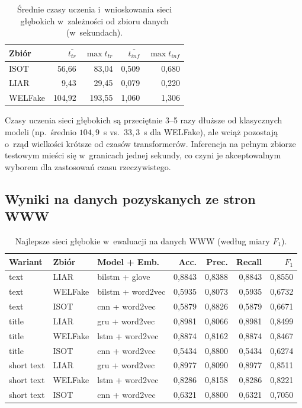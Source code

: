 \begin{table}[ht]
\centering
\caption{Średnie czasy uczenia i~wnioskowania sieci głębokich
w~zależności od zbioru danych (w~sekundach).}
\label{tab:dl_czasy}
\begin{tabular}{lrrrr}
\toprule
Zbiór & $\overline{t_{tr}}$ & $\max{t_{tr}}$ & $\overline{t_{inf}}$ & $\max{t_{inf}}$ \\
\midrule
ISOT    & 56,66  & 83,04  & 0,509 & 0,680 \\
LIAR    & 9,43   & 29,45  & 0,079 & 0,220 \\
WELFake & 104,92 & 193,55 & 1,060 & 1,306 \\
\bottomrule
\end{tabular}
\end{table}

Czasy uczenia sieci głębokich są przeciętnie 3--5 razy dłuższe od
klasycznych modeli (np.\ średnio \(104{,}9\)~s vs.\ \(33{,}3\)~s dla
WELFake), ale wciąż pozostają o~rząd wielkości krótsze od czasów
transformerów. Inferencja na pełnym zbiorze testowym mieści się
w~granicach jednej sekundy, co czyni je akceptowalnym wyborem dla
zastosowań czasu rzeczywistego.

\subsection{Wyniki na danych pozyskanych ze stron WWW}
\label{sec:wyniki_glebokie_web}

\begin{table}[ht]
\centering
\caption{Najlepsze sieci głębokie w~ewaluacji na danych WWW
(według miary $F_1$).}
\label{tab:dl_web}
\begin{tabular}{lllrrrr}
\toprule
Wariant & Zbiór & Model + Emb. & Acc. & Prec. & Recall & $F_1$ \\
\midrule
text       & LIAR    & bilstm + glove    & 0,8843 & 0,8388 & 0,8843 & 0,8550 \\
text       & WELFake & bilstm + word2vec & 0,5935 & 0,8073 & 0,5935 & 0,6732 \\
text       & ISOT    & cnn + word2vec    & 0,5879 & 0,8826 & 0,5879 & 0,6671 \\
title      & LIAR    & gru + word2vec    & 0,8981 & 0,8066 & 0,8981 & 0,8499 \\
title      & WELFake & lstm + word2vec   & 0,8874 & 0,8162 & 0,8874 & 0,8467 \\
title      & ISOT    & cnn + word2vec    & 0,5434 & 0,8800 & 0,5434 & 0,6274 \\
short text & LIAR    & gru + word2vec    & 0,8977 & 0,8090 & 0,8977 & 0,8511 \\
short text & WELFake & lstm + word2vec   & 0,8286 & 0,8158 & 0,8286 & 0,8221 \\
short text & ISOT    & cnn + word2vec    & 0,6321 & 0,8800 & 0,6321 & 0,7050 \\
\bottomrule
\end{tabular}
\end{table}

